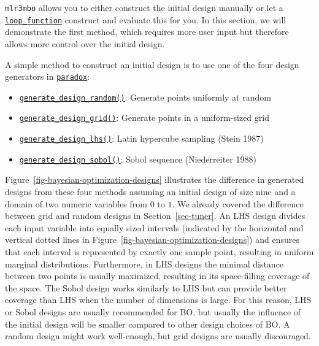 \texttt{mlr3mbo} allows you to either construct the initial design
manually or let a
\href{https://mlr3mbo.mlr-org.com/reference/loop_function.html}{\texttt{loop\_function}}
construct and evaluate this for you. In this section, we will
demonstrate the first method, which requires more user input but
therefore allows more control over the initial design.

A simple method to construct an initial design is to use one of the four
design generators in
\href{https://paradox.mlr-org.com}{\texttt{paradox}}:

\begin{itemize}
\tightlist
\item
  \href{https://paradox.mlr-org.com/reference/generate_design_random.html}{\texttt{generate\_design\_random()}}:
  Generate points uniformly at random
\item
  \href{https://paradox.mlr-org.com/reference/generate_design_grid.html}{\texttt{generate\_design\_grid()}}:
  Generate points in a uniform-sized grid
\item
  \href{https://paradox.mlr-org.com/reference/generate_design_lhs.html}{\texttt{generate\_design\_lhs()}}:
  Latin hypercube sampling (Stein 1987)
\item
  \href{https://paradox.mlr-org.com/reference/generate_design_sobol.html}{\texttt{generate\_design\_sobol()}}:
  Sobol sequence (Niederreiter 1988)
\end{itemize}

Figure~\ref{fig-bayesian-optimization-designs} illustrates the
difference in generated designs from these four methods assuming an
initial design of size nine and a domain of two numeric variables from
\(0\) to \(1\). We already covered the difference between grid and
random designs in Section~\ref{sec-tuner}. An LHS design divides each
input variable into equally sized intervals (indicated by the horizontal
and vertical dotted lines in
Figure~\ref{fig-bayesian-optimization-designs}) and ensures that each
interval is represented by exactly one sample point, resulting in
uniform marginal distributions. Furthermore, in LHS designs the minimal
distance between two points is usually maximized, resulting in its
space-filling coverage of the space. The Sobol design works similarly to
LHS but can provide better coverage than LHS when the number of
dimensions is large. For this reason, LHS or Sobol designs are usually
recommended for BO, but usually the influence of the initial design will
be smaller compared to other design choices of BO. A random design might
work well-enough, but grid designs are usually discouraged.

